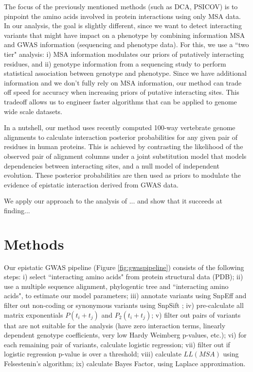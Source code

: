 The focus of the previously mentioned methods (such as DCA, PSICOV) is to pinpoint the amino acids involved in protein interactions using only MSA data. In our analysis, the goal is slightly different, since we want to detect interacting variants that might have impact on a phenotype by combining information MSA and GWAS information (sequencing and phenotype data). For this, we use a ``two tier" analysis: i) MSA information modulates our priors of putatively interacting residues, and ii) genotype information from a sequencing study to perform statistical association between genotype and phenotype. Since we have additional information and we don’t fully rely on MSA information, our method can trade off speed for accuracy when increasing priors of putative interacting sites. This tradeoff allows us to engineer faster algorithms that can be applied to genome wide scale datasets.

In a nutshell, our method uses recently computed 100-way vertebrate genome alignments to calculate interaction posterior probabilities for any given pair of residues in human proteins. This is achieved by contrasting the likelihood of the observed pair of alignment columns under a joint substitution model that models dependencies between interacting sites, and a null model of independent evolution.  These posterior probabilities are then used as priors to modulate the evidence of epistatic interaction derived from GWAS data. 

{ \huge We apply our approach to the analysis of ... and show that it succeeds at finding...}

\section{Methods}

Our epistatic GWAS pipeline (Figure \ref{fig:gwaspipeline}) consists of the following steps: i) select ``interacting amino acids" from protein structural data (PDB); ii) use a multiple sequence alignment, phylogentic tree and ``interacting amino acids", to estimate our model parameters; iii) annotate variants using SnpEff \cite{cingolani2012program} and filter out non-coding or synonymous variants using SnpSift \cite{cingolani2012using}; iv) pre-calculate all matrix exponentials $P(t_i+t_j)$ and $P_2(t_i+t_j)$; v) filter out pairs of variants that are not suitable for the analysis (have zero interaction terms, linearly dependent genotype coefficients, very low Hardy Weimberg p-values, etc.); vi) for each remaining pair of variants, calculate logistic regression; vii) filter out if logistic regression p-value is over a threshold; viii) calculate $LL(MSA)$ using Felsestenin’s algorithm; ix) calculate Bayes Factor, using Laplace approximation.


